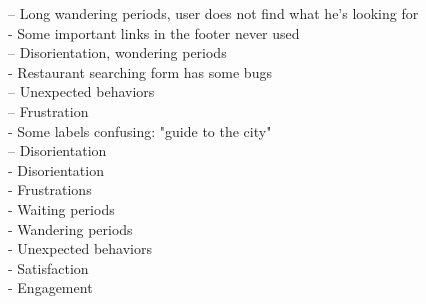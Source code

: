         -- Long wandering periods, user does not find what he's looking for\\
    - Some important links in the footer never used\\
        -- Disorientation, wondering periods\\
    - Restaurant searching form has some bugs\\
        -- Unexpected behaviors\\
        -- Frustration\\
    - Some labels confusing: "guide to the city"\\
        -- Disorientation\\



    - Disorientation\\
    - Frustrations\\
    - Waiting periods\\
    - Wandering periods\\
    - Unexpected behaviors\\
    - Satisfaction\\
    - Engagement\\